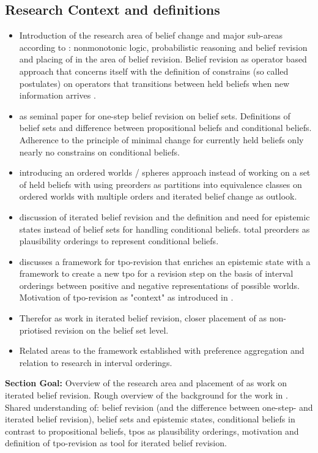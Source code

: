 \documentclass[11pt]{article}
\begin{document}
\subsection{Research Context and definitions}
\begin{itemize}
    \item Introduction of the research area of belief change and major sub-areas according to \cite{Darwiche1997}: nonmonotonic logic, probabilistic reasoning and belief revision and placing of \cite{Booth2011} in the area of belief revision. Belief revision as operator based approach that concerns itself with the definition of constrains (so called postulates) on operators that transitions between held beliefs when new information arrives \cite{Darwiche1997}.
    \item \cite{Alchourron1985} as seminal paper for one-step belief revision on belief sets. Definitions of belief sets and difference between propositional beliefs and conditional beliefs. Adherence to the principle of minimal change for currently held beliefs only nearly no constrains on conditional beliefs.
    \item \cite{Grove1988} introducing an ordered worlds / spheres approach instead of working on a set of held beliefs with \cite{Booth2004} using preorders as partitions into equivalence classes on ordered worlds with multiple orders and iterated belief change as outlook.
    \item \cite{Darwiche1997} discussion of \gls{iterated belief revision} and the definition and need for epistemic states instead of belief sets for handling conditional beliefs. \Gls{total preorder}s as plausibility orderings to represent conditional beliefs.
    \item \cite{Booth2011} discusses a framework for tpo-revision that enriches an epistemic state with a framework to create a new tpo for a revision step on the basis of interval orderings between positive and negative representations of possible worlds. Motivation of tpo-revision as "context" as introduced in \cite{Booth2007}.
    \item Therefor \cite{Booth2011} as work in iterated belief revision, closer placement of \cite{Booth2011} as \gls{non-priotised revision} on the belief set level.
    \item Related areas to the framework established \cite{Booth2011} with preference aggregation and relation to research in interval orderings.
\end{itemize}
\textbf{Section Goal:} Overview of the research area and placement of \cite{Booth2011} as work on iterated belief revision. Rough overview of the background for the work in \cite{Booth2011}. Shared understanding of: belief revision (and the difference between one-step- and iterated belief revision), belief sets and epistemic states, conditional beliefs in contrast to propositional beliefs, tpos as plausibility orderings, motivation and definition of tpo-revision as tool for iterated belief revision.
\end{document}
